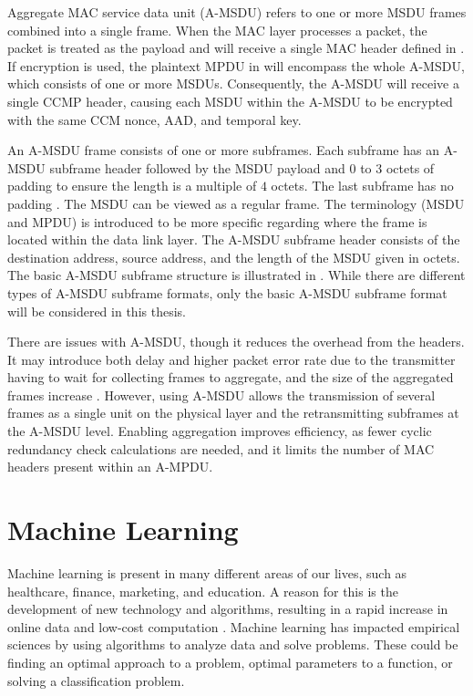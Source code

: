Aggregate MAC service data unit (A-MSDU) refers to one or more MSDU frames combined into a single frame. When the MAC layer processes a packet, the packet is treated as the payload and will receive a single MAC header defined in . If encryption is used, the plaintext MPDU in  will encompass the whole A-MSDU, which consists of one or more MSDUs. Consequently, the A-MSDU will receive a single CCMP header, causing each MSDU within the A-MSDU to be encrypted with the same CCM nonce, AAD, and temporal key.

An A-MSDU frame consists of one or more subframes. Each subframe has an A-MSDU subframe header followed by the MSDU payload and $0$ to $3$ octets of padding to ensure the length is a multiple of $4$ octets. The last subframe has no padding \cite{9363693}. The MSDU can be viewed as a regular frame. The terminology (MSDU and MPDU) is introduced to be more specific regarding where the frame is located within the data link layer. The A-MSDU subframe header consists of the destination address, source address, and the length of the MSDU given in octets. The basic A-MSDU subframe structure is illustrated in . While there are different types of A-MSDU subframe formats, only the basic A-MSDU subframe format will be considered in this thesis.

There are issues with A-MSDU, though it reduces the overhead from the headers. It may introduce both delay and higher packet error rate due to the transmitter having to wait for collecting frames to aggregate, and the size of the aggregated frames increase \cite{bhanage2017amsdu}. However, using A-MSDU allows the transmission of several frames as a single unit on the physical layer and the retransmitting subframes at the A-MSDU level. Enabling aggregation improves efficiency, as fewer cyclic redundancy check calculations are needed, and it limits the number of MAC headers present within an A-MPDU.

\section{Machine Learning\label{sec:machine-back}}

Machine learning is present in many different areas of our lives, such as healthcare, finance, marketing, and education. A reason for this is the development of new technology and algorithms, resulting in a rapid increase in online data and low-cost computation \cite{jordan2015machine}. Machine learning has impacted empirical sciences by using algorithms to analyze data and solve problems. These could be finding an optimal approach to a problem, optimal parameters to a function, or solving a classification problem.

